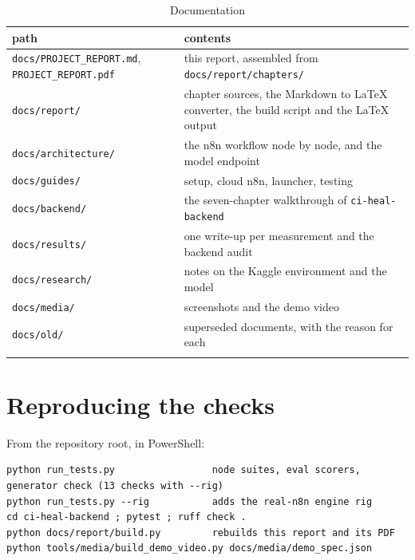 \begingroup\small
\begin{longtable}{>{\raggedright\arraybackslash}p{0.489\dimexpr\linewidth-4\tabcolsep\relax}>{\raggedright\arraybackslash}p{0.511\dimexpr\linewidth-4\tabcolsep\relax}}
\toprule
\rowcolor{gray!14}\textbf{path} & \textbf{contents} \\
\midrule
\endhead
\bottomrule
\endfoot
\endlastfoot
\texttt{docs/\allowbreak{}PROJECT\_\allowbreak{}REPORT.\allowbreak{}md}, \texttt{PROJECT\_\allowbreak{}REPORT.\allowbreak{}pdf} & this report, assembled from \texttt{docs/\allowbreak{}report/\allowbreak{}chapters/\allowbreak{}} \\
\texttt{docs/\allowbreak{}report/\allowbreak{}} & chapter sources, the Markdown to LaTeX converter, the build script and the LaTeX output \\
\texttt{docs/\allowbreak{}architecture/\allowbreak{}} & the n8n workflow node by node, and the model endpoint \\
\texttt{docs/\allowbreak{}guides/\allowbreak{}} & setup, cloud n8n, launcher, testing \\
\texttt{docs/\allowbreak{}backend/\allowbreak{}} & the seven-chapter walkthrough of \texttt{ci-\allowbreak{}heal-\allowbreak{}backend} \\
\texttt{docs/\allowbreak{}results/\allowbreak{}} & one write-up per measurement and the backend audit \\
\texttt{docs/\allowbreak{}research/\allowbreak{}} & notes on the Kaggle environment and the model \\
\texttt{docs/\allowbreak{}media/\allowbreak{}} & screenshots and the demo video \\
\texttt{docs/\allowbreak{}old/\allowbreak{}} & superseded documents, with the reason for each \\
\bottomrule
\caption{Documentation}\label{tab:appendix-2}\\
\end{longtable}
\endgroup

\section{Reproducing the checks}

From the repository root, in PowerShell:

\begin{lstlisting}
python run_tests.py                 node suites, eval scorers, generator check (13 checks with --rig)
python run_tests.py --rig           adds the real-n8n engine rig
cd ci-heal-backend ; pytest ; ruff check .
python docs/report/build.py         rebuilds this report and its PDF
python tools/media/build_demo_video.py docs/media/demo_spec.json
\end{lstlisting}

